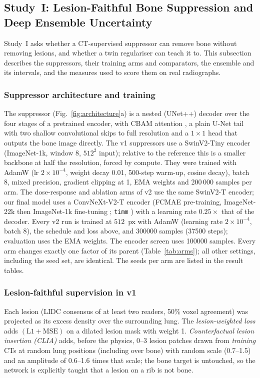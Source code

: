 \subsection{Study~I: Lesion-Faithful Bone Suppression and Deep Ensemble Uncertainty}
\label{sec:m-study1}
Study~I asks whether a CT-supervised suppressor can remove bone without removing lesions, and whether a twin regulariser can teach it to.
This subsection describes the suppressors, their training arms and comparators, the ensemble and its intervals, and the measures used to
score them on real radiographs.

\subsubsection{Suppressor architecture and training}
The suppressor (Fig.~\ref{fig:architecture}a) is a nested (UNet++) decoder \cite{zhou2018unetpp} over the four stages of a pretrained
encoder, with CBAM attention \cite{woo2018cbam}, a plain U-Net tail with two shallow convolutional skips to full resolution and a
$1\times1$ head that outputs the bone image directly. The v1 suppressors use a SwinV2-Tiny encoder \cite{liu2022swinv2} (ImageNet-1k,
window 8, $512^2$ input); relative to the reference this is a smaller backbone at half the resolution, forced by compute. They were trained
with AdamW (lr $2\times10^{-4}$, weight decay 0.01, 500-step warm-up, cosine decay), batch 8, mixed precision, gradient clipping at 1, EMA
weights and 200\,000 samples per arm. The dose-response and ablation arms of v2 use the same SwinV2-T encoder; our final model uses a
ConvNeXt-V2-T encoder \cite{woo2023convnextv2} (FCMAE pre-training, ImageNet-22k then ImageNet-1k fine-tuning \cite{deng2009imagenet};
\texttt{timm} \cite{wightman2019timm} ) with a learning rate $0.25\times$ that of the decoder.
Every v2 run is trained at $512$~px with AdamW \cite{loshchilov2019adamw} (learning rate $2\times10^{-4}$, batch 8), the schedule and loss
above, and \num{300000} samples (\num{37500} steps); evaluation uses the EMA weights. The encoder screen uses \num{100000} samples. Every arm
changes exactly one factor of its parent (Table~\ref{tab:arms}); all other settings, including the seed set, are identical. The seeds per
arm are listed in the result tables.

\subsubsection{Lesion-faithful supervision in v1}
Each lesion (LIDC consensus of at least two readers, 50\% voxel agreement) was projected as its excess density over the surrounding lung.
The \emph{lesion-weighted loss} adds $(\mathrm{L1}+\mathrm{MSE})$ on a dilated lesion mask with weight 1. \emph{Counterfactual lesion
insertion (CLIA)} adds, before the physics, 0--3 lesion patches drawn from \emph{training} CTs at random lung positions (including over bone)
with random scale (0.7--1.5) and an amplitude of 0.6--1.6 times that scale; the bone target is untouched, so the network is explicitly
taught that a lesion on a rib is not bone.

